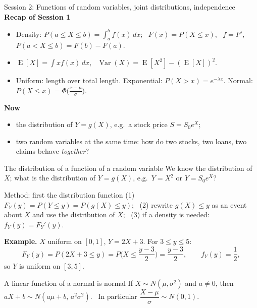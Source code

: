 \documentclass[aspectratio=169,11pt,usepdftitle=false]{beamer}
\newcommand{\E}{\operatorname{E}}
\newcommand{\Var}{\operatorname{Var}}
\begin{document}
\begin{frame}{Session 2: Functions of random variables, joint
    distributions, independence}
  \small
  \textbf{Recap of Session 1}
  \begin{itemize}
    \item Density: $P(a\le X\le b)=\int_a^b f(x)\,dx$; \
          $F(x)=P(X\le x)$, \ $f=F'$, \ $P(a<X\le b)=F(b)-F(a)$.
    \item $\E[X]=\int x f(x)\,dx$, \ $\Var(X)=\E[X^2]-(\E[X])^2$.
    \item Uniform: length over total length. Exponential:
          $P(X>x)=e^{-\lambda x}$. Normal: $P(X\le x)=
          \Phi\big(\frac{x-\mu}{\sigma}\big)$.
  \end{itemize}
  \vspace{2mm}
  \textbf{Now}
  \begin{itemize}
    \item the distribution of $Y=g(X)$, e.g.\ a stock price $S=S_0e^X$;
    \item two random variables at the same time: how do two stocks, two
          loans, two claims behave \emph{together}?
  \end{itemize}
\end{frame}

\begin{frame}{The distribution of a function of a random variable}
  \small
  We know the distribution of $X$; what is the distribution of
  $Y=g(X)$, e.g.\ $Y=X^2$ or $Y=S_0e^X$?
  \begin{block}{Method: first the distribution function}
    (1) $F_Y(y)=P(Y\le y)=P(g(X)\le y)$; \
    (2) rewrite $g(X)\le y$ as an event about $X$ and use the distribution
    of $X$; \
    (3) if a density is needed: $f_Y(y)=F_Y'(y)$.
  \end{block}
  \textbf{Example.} $X$ uniform on $[0,1]$, $Y=2X+3$. For $3\le y\le 5$:
  \[ F_Y(y)=P(2X+3\le y)=P\Big(X\le \frac{y-3}{2}\Big)=\frac{y-3}{2}, \qquad
    f_Y(y)=\frac12 , \]
  so $Y$ is uniform on $[3,5]$.
  \begin{block}{A linear function of a normal is normal}
    If $X\sim N(\mu,\sigma^2)$ and $a\ne0$, then
    $aX+b\sim N(a\mu+b,\,a^2\sigma^2)$. \ In particular
    $\dfrac{X-\mu}{\sigma}\sim N(0,1)$.
  \end{block}
\end{frame}


\end{document}

